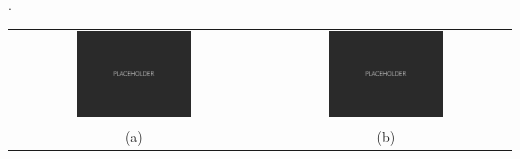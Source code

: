 \lipsum[7] \cite{cite1}.
%
\begin{center}
	\setlength{\tabcolsep}{2pt}
	\begin{tabular}{cc}
		\includegraphics[width=0.48\textwidth]{fig/placeholder.pdf}  &
		\includegraphics[width=0.48\textwidth]{fig/placeholder.pdf} \\ [-1ex]
		\scriptsize{(a)} & \scriptsize{(b)}
	\end{tabular}
	\vspace{-5pt}
	\label{fig:figlabel}
\end{center}

\lipsum[8] \\

\lipsum[10]
